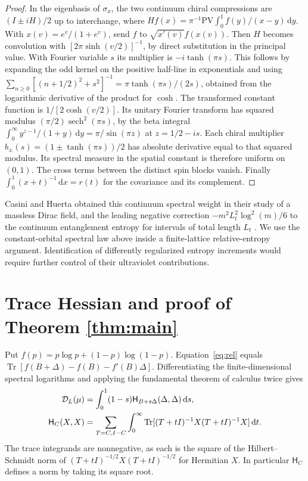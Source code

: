 \documentclass[11pt,letterpaper]{article}
\newcommand{\Tr}{\operatorname{Tr}}
\newcommand{\cD}{\mathcal D}
\newcommand{\cH}{\mathsf H}
\newcommand{\dd}{\,\mathrm d}
\begin{document}
\begin{proof}
In the eigenbasis of \(\sigma_x\), the two continuum chiral compressions are \((I\pm iH)/2\) up to interchange, where \(Hf(x)=\pi^{-1}\mathrm{PV}\int_0^1 f(y)/(x-y)\dd y\). With \(x(v)=e^v/(1+e^v)\), send \(f\) to \(\sqrt{x'(v)}f(x(v))\). Then \(H\) becomes convolution with \([2\pi\sinh(v/2)]^{-1}\), by direct substitution in the principal value. With Fourier variable \(s\) its multiplier is \(-i\tanh(\pi s)\). This follows by expanding the odd kernel on the positive half-line in exponentials and using \(\sum_{n\ge0}[(n+1/2)^2+s^2]^{-1}=\pi\tanh(\pi s)/(2s)\), obtained from the logarithmic derivative of the product for \(\cosh\). The transformed constant function is \(1/[2\cosh(v/2)]\). Its unitary Fourier transform has squared modulus \((\pi/2)\operatorname{sech}^2(\pi s)\), by the beta integral \(\int_0^\infty y^{z-1}/(1+y)\dd y=\pi/\sin(\pi z)\) at \(z=1/2-is\). Each chiral multiplier \(b_\pm(s)=(1\pm\tanh(\pi s))/2\) has absolute derivative equal to that squared modulus. Its spectral measure in the spatial constant is therefore uniform on \((0,1)\). The cross terms between the distinct spin blocks vanish. Finally \(\int_0^1(x+t)^{-1}\dd x=r(t)\) for the covariance and its complement.
\end{proof}

Casini and Huerta obtained this continuum spectral weight in their study of a massless Dirac field, and the leading negative correction \(-m^2L_t^2\log^2(m)/6\) to the continuum entanglement entropy for intervals of total length \(L_t\) \cite[Eqs.~(71)--(75)]{ch}. We use the constant-orbital spectral law above inside a finite-lattice relative-entropy argument. Identification of differently regularized entropy increments would require further control of their ultraviolet contributions.

\section{Trace Hessian and proof of Theorem \ref{thm:main}}
Put \(f(p)=p\log p+(1-p)\log(1-p)\). Equation~\eqref{eq:rel} equals
\(\Tr[f(B+\Delta)-f(B)-f'(B)\Delta]\). Differentiating the finite-dimensional spectral logarithms and applying the fundamental theorem of calculus twice gives
\begin{align}
 \cD_L(\mu)&=\int_0^1(1-s)\cH_{B+s\Delta}(\Delta,\Delta)\dd s,\label{eq:hess}\\
 \cH_C(X,X)&=\sum_{T=C,I-C}\int_0^\infty
 \Tr[(T+tI)^{-1}X(T+tI)^{-1}X]\dd t .\notag
\end{align}
The trace integrands are nonnegative, as each is the square of the Hilbert--Schmidt norm of \((T+tI)^{-1/2}X(T+tI)^{-1/2}\) for Hermitian \(X\). In particular \(\cH_C\) defines a norm by taking its square root.
\end{document}
